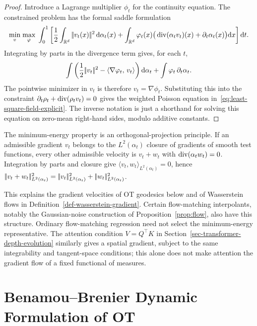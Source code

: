 \begin{proof}
	Introduce a Lagrange multiplier $\phi_t$ for the continuity equation. The constrained problem has the formal saddle formulation
	\[
		\underset{v}{\min}\;\underset{\varphi}{\max}\;
		\int_0^1
		\left[
			\frac12\int_{\mathbb{R}^d}|\!| v_t(x) |\!|^2\,\mathrm{d}\alpha_t(x)
			+\int_{\mathbb{R}^d}\varphi_t(x)\big(\operatorname{div}(\alpha_t v_t)(x)+\partial_t\alpha_t(x)\big)\mathrm{d} x
		\right]\mathrm{d} t.
	\]
	Integrating by parts in the divergence term gives, for each $t$,
	\[
		\int \left(\frac12|\!| v_t |\!|^2-\langle \nabla\varphi_t,\,v_t\rangle\right)\mathrm{d}\alpha_t
		+
		\int \varphi_t\,\partial_t\alpha_t.
	\]
	The pointwise minimizer in $v_t$ is therefore $v_t=\nabla\phi_t$. Substituting this into the constraint $\partial_t\rho_t+\operatorname{div}(\rho_t v_t)=0$ gives the weighted Poisson equation in~\eqref{eq:least-square-field-explicit}. The inverse notation is just a shorthand for solving this equation on zero-mean right-hand sides, modulo additive constants.
\end{proof}

The minimum-energy property is an orthogonal-projection principle. If an admissible gradient $v_t$ belongs to the $L^2(\alpha_t)$ closure of gradients of smooth test functions, every other admissible velocity is $v_t+w_t$ with $\operatorname{div}(\alpha_t w_t)=0$. Integration by parts and closure give $\langle v_t,w_t\rangle_{L^2(\alpha_t)}=0$, hence $|\!| v_t+w_t |\!|_{L^2(\alpha_t)}^2=|\!| v_t |\!|_{L^2(\alpha_t)}^2+|\!| w_t |\!|_{L^2(\alpha_t)}^2$.

This explains the gradient velocities of OT geodesics below and of Wasserstein flows in Definition~\ref{def-wasserstein-gradient}. Certain flow-matching interpolants, notably the Gaussian-noise construction of Proposition~\ref{prop:flow}, also have this structure. Ordinary flow-matching regression need not select the minimum-energy representative. The attention condition $V=Q^\top K$ in Section~\ref{sec-transformer-depth-evolution} similarly gives a spatial gradient, subject to the same integrability and tangent-space conditions; this alone does not make attention the gradient flow of a fixed functional of measures.


\section{Benamou--Brenier Dynamic Formulation of OT}
\label{sec-benamou-brenier-dynamic}

